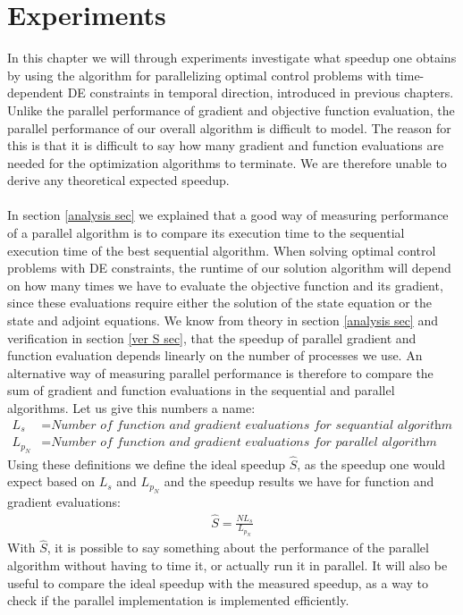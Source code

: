 \chapter{Experiments}\label{Experiments chapter}
In this chapter we will through experiments investigate what speedup one obtains by using the algorithm for parallelizing optimal control problems with  time-dependent DE constraints in temporal direction, introduced in previous chapters. Unlike the parallel performance of gradient and objective function evaluation, the parallel performance of our overall algorithm is difficult to model. The reason for this is that it is difficult to say how many gradient and function evaluations are needed for the optimization algorithms to terminate. We are therefore unable to derive any theoretical expected speedup.
\\
\\
In section \ref{analysis sec} we explained that a good way of measuring performance of a parallel algorithm is to compare its execution time to the sequential execution time of the best sequential algorithm. When solving optimal control problems with DE constraints, the runtime of our solution algorithm will depend on how many times we have to evaluate the objective function and its gradient, since these evaluations require either the solution of the state equation or the state and adjoint equations. We know from theory in section \ref{analysis sec} and verification in section \ref{ver S sec}, that the speedup of parallel gradient and function evaluation depends linearly on the number of processes we use. An alternative way of measuring parallel performance is therefore to compare the sum of gradient and function evaluations in the sequential and parallel algorithms. Let us give this numbers a name:
\begin{align*}
L_s &= \textit{Number of function and gradient evaluations for sequantial algorithm}\\
L_{p_N} &= \textit{Number of function and gradient evaluations for parallel algorithm using N processes}
\end{align*} 
Using these definitions we define the ideal speedup $\hat{S}$, as the speedup one would expect based on $L_s$ and $L_{p_N}$ and the speedup results we have for function and gradient evaluations:
\begin{align}
\hat S = \frac{NL_s}{L_{p_N}} \label{ideal S}
\end{align}
With $\hat S$, it is possible to say something about the performance of the parallel algorithm without having to time it, or actually run it in parallel. It will also be useful to compare the ideal speedup with the measured speedup, as a way to check if the parallel implementation is implemented efficiently.
